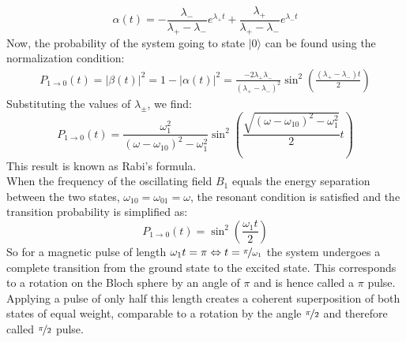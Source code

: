 \documentclass[12pt,a4paper]{article}
\begin{document}
\begin{equation}
\alpha(t)=-\frac{\lambda_-}{\lambda_+-\lambda_-}e^{\lambda_+t}+\frac{\lambda_+}{\lambda_+-\lambda_-}e^{\lambda_-t}
\end{equation}
Now, the probability of the system going to state $|0\rangle$ can be found using the normalization condition:
\begin{align}
P_{1\rightarrow 0}(t)=|\beta(t)|^2=1-|\alpha(t)|^2
=\frac{-2\lambda_+\lambda_-}{(\lambda_+-\lambda_-)^2}\sin^2\left(\frac{(\lambda_+-\lambda_-)t}{2}\right)
\end{align}
Substituting the values of $\lambda_\pm$, we find:
\begin{equation}
P_{1\rightarrow 0}(t)=\frac{\omega_1^2}{(\omega-\omega_{10})^2-\omega_1^2}\sin^2\left(\frac{\sqrt{(\omega-\omega_{10})^2-\omega_1^2}}{2}t\right)
\end{equation}
This result is known as Rabi's formula. \\
When the frequency of the oscillating field $B_1$ equals the energy separation between the two states, $\omega_{10}=\omega_{01}=\omega$, the resonant condition is satisfied and the transition probability is simplified as:
\begin{equation}
P_{1\rightarrow 0}(t)=\sin^2\left(\frac{\omega_1 t}{2}\right)
\end{equation}
So for a magnetic pulse of length $\omega_1 t=\pi \Leftrightarrow t=\nicefrac{\pi}{\omega_1}$ the system undergoes a complete transition from the ground state to the excited state. This corresponds to a rotation on the Bloch sphere by an angle of $\pi$ and is hence called a $\pi$ pulse. Applying a pulse of only half this length creates a coherent superposition of both states of equal weight, comparable to a rotation by the angle $\nicefrac{\pi}{2}$ and therefore called $\nicefrac{\pi}{2}$ pulse.
\end{document}
